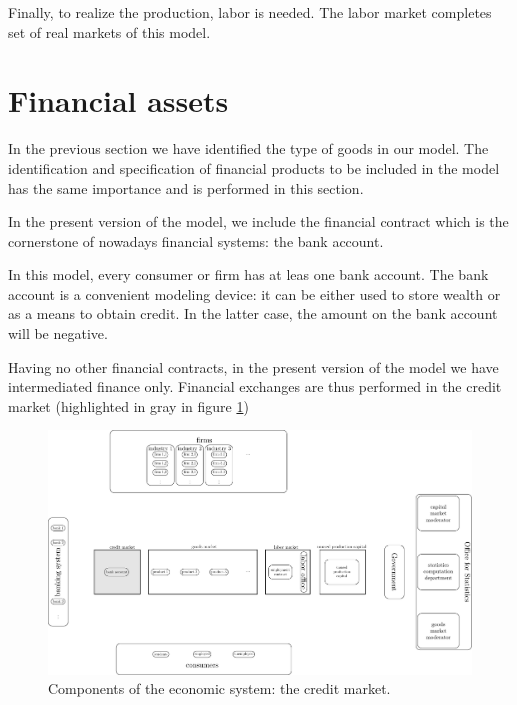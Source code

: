 \documentclass{book}
\begin{document}
Finally, to realize the production, labor is needed.  The labor market completes set of real markets of this model.  



\clearpage
\section{Financial assets}

In the previous section we have identified the type of goods in our model. The identification and specification of financial products to be included in the model has the same importance and is performed in this section. 

In the present version of the model, we include the financial contract which is the cornerstone of nowadays financial systems: the bank account.

In this model, every consumer or firm has at leas one bank account. The bank account is a convenient modeling device: it can be either used to store wealth or as a means to obtain credit. In the latter case, the amount on the bank account will be negative.

Having no other financial contracts, in the present version of the model we have intermediated finance only. %
Financial exchanges are thus performed in the credit market (highlighted in gray in figure \ref{fig:componentsc3})

\begin{figure}[htp]
\hskip-1cm\includegraphics[scale=0.5]{agents_and_interactions_figure1c3-0.pdf}
	\caption{Components of the economic system: the credit market.}
	\label{fig:componentsc3}
\end{figure}
\end{document}
